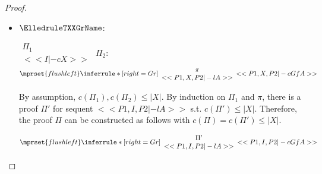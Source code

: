 \begin{proof}
\begin{enumerate}
\begin{itemize}
  \item $\ElledruleTXXGrName$:
    \begin{center}
      \scriptsize
      \begin{math}
        \begin{array}{c}
          \Pi_1 \\
          {<<I |-c X>>}
        \end{array}
      \end{math}
      \qquad\qquad
      $\Pi_2$:
      \begin{math}
        $$\mprset{flushleft}
        \inferrule* [right={\tiny Gr}] {
          {
            \begin{array}{c}
              \pi \\
              {<<P1, X, P2 |-l A>>}
            \end{array}
          }
        }{<<P1, X, P2 |-c Gf A>>}
      \end{math}
    \end{center}
    By assumption, $c(\Pi_1),c(\Pi_2)\leq |X|$. By induction on $\Pi_1$ and $\pi$, there is a
    proof $\Pi'$ for sequent $<<P1, I, P2 |-l A>>$ s.t. $c(\Pi') \leq |X|$. Therefore, the
    proof $\Pi$ can be constructed as follows with $c(\Pi) = c(\Pi') \leq |X|$.
    \begin{center}
      \scriptsize
      \begin{math}
        $$\mprset{flushleft}
        \inferrule* [right={\tiny Gr}] {
          {
            \begin{array}{c}
              \Pi' \\
              {<<P1, I, P2 |-l A>>}
            \end{array}
          }
        }{<<P1, I, P2 |-c Gf A>>}
      \end{math}
    \end{center}


\end{itemize}
\end{enumerate}
\end{proof}
